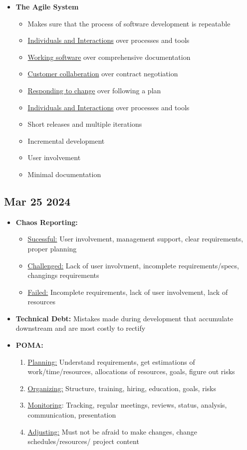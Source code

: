 \documentclass[12pt]{article}
\begin{document}
\begin{itemize}
		  \item \textbf{The Agile System}
		  		\begin{itemize}
					\item Makes sure that the process of software development is repeatable
					\item \underline{Individuals and Interactions} over processes and tools
					\item \underline{Working software} over comprehensive documentation
					\item \underline{Customer collaberation} over contract negotiation
					\item \underline{Responding to change} over following a plan
					\item \underline{Individuals and Interactions} over processes and tools
					\item Short releases and multiple iterations
					\item Incremental development
					\item User involvement
					\item Minimal documentation
				\end{itemize}
\end{itemize}

\subsection*{Mar 25 2024}

\begin{itemize}
		  \item \textbf{Chaos Reporting:}
		  		\begin{itemize}
					\item \underline{Sucessful:} User involvement, management support, 
						clear requirements, proper planning
					\item \underline{Challenged:} Lack of user involvment, incomplete requirements/specs, 
						changings requirements
					\item \underline{Failed:} Incomplete requirements, lack of user involvement, lack of resources
				\end{itemize}
		  \item \textbf{Technical Debt:} Mistakes made during development that accumulate downstream and are 
		  		most costly to rectify
		  \item \textbf{POMA:}
		  		\begin{enumerate}
					\item \underline{Planning:} Understand requirements, get estimations of work/time/resources,
						allocations of resources, goals, figure out risks
					\item \underline{Organizing:} Structure, training, hiring, education, goals, risks
					\item \underline{Monitoring}: Tracking, regular meetings, reviews, status, analysis, communication,
						presentation
					\item \underline{Adjusting:} Must not be afraid to make changes, change schedules/resources/
						project content
				\end{enumerate}
\end{itemize}
\end{document}
